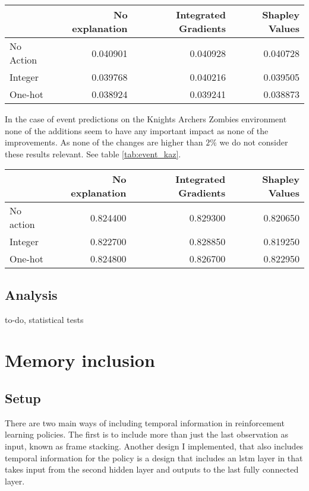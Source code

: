 \documentclass[UKenglish]{uiomasterthesis}
\begin{document}
\begin{center}
\label{tab:state_kaz}
\begin{tabular}{lrrr}
\toprule
 & No explanation & Integrated Gradients & Shapley Values \\
\midrule
No Action & 0.040901 & 0.040928 & 0.040728 \\
Integer & 0.039768 & 0.040216 & 0.039505 \\
One-hot & 0.038924 & 0.039241 & 0.038873 \\
\bottomrule
\end{tabular}
\end{center}

In the case of event predictions on the Knights Archers Zombies environment none of the additions seem to have any important impact as none of the improvements. As none of the changes are higher than $2\%$ we do not consider these results relevant. See table \ref{tab:event_kaz}.

\begin{center}
\label{tab:event_kaz}
\begin{tabular}{lrrr}
\toprule
 & No explanation & Integrated Gradients & Shapley Values \\
\midrule
No action & 0.824400 & 0.829300 & 0.820650 \\
Integer & 0.822700 & 0.828850 & 0.819250 \\
One-hot & 0.824800 & 0.826700 & 0.822950 \\
\bottomrule
\end{tabular}
\end{center}

\subsection{Analysis}
to-do, statistical tests

\section{Memory inclusion}

\subsection{Setup}

There are two main ways of including temporal information in reinforcement learning policies. The first is to include more than just the last observation as input, known as frame stacking. Another design I implemented, that also includes temporal information for the policy is a design that includes an \ac{lstm} layer in that takes input from the second hidden layer and outputs to the last fully connected layer.
\end{document}
